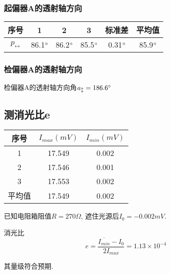 \documentclass{thureport}
\def\de{{\ensuremath{^\circ\hspace{-0.09em}}}}
\begin{document}
\subsubsection{起偏器A的透射轴方向}
\begin{table}[htbp]
    \centering
      \begin{tabular}{|c|c|c|c|c|c|}
      \hline
      序号    & 1     & 2     & 3     & 标准差   & 平均值 \bigstrut\\
      \hline
      $p_{\leftrightarrow}$ & 86.1\de  & 86.2\de  & 85.5\de  & 0.31\de  & 85.9\de  \bigstrut\\
      \hline
      \end{tabular}%
    \label{tab:addlabel}%
  \end{table}%

\subsubsection{检偏器A的透射轴方向}
检偏器A的透射轴方向角$a_{\updownarrow}=186.6\de$

\subsection{测消光比e}
\begin{table}[htbp]
    \centering
      \begin{tabular}{|c|c|c|}
      \hline
      序号    & $I_{max}(mV)$ & $I_{min}(mV)$ \bigstrut\\
      \hline
      1     & 17.549  & 0.002  \bigstrut\\
      \hline
      2     & 17.546  & 0.001  \bigstrut\\
      \hline
      3     & 17.553  & 0.002  \bigstrut\\
      \hline
      平均值   & 17.549  & 0.002  \bigstrut\\
      \hline
      \end{tabular}%
    \label{tab:addlabel}%
  \end{table}%

已知电阻箱阻值$R=270\Omega$, 遮住光源后$I_0=-0.002mV$.

消光比
$$e=\frac{\overline{I_{min}}-I_0}{2I_{max}}=1.13\times10^{-4}$$

其量级符合预期.
\end{document}
